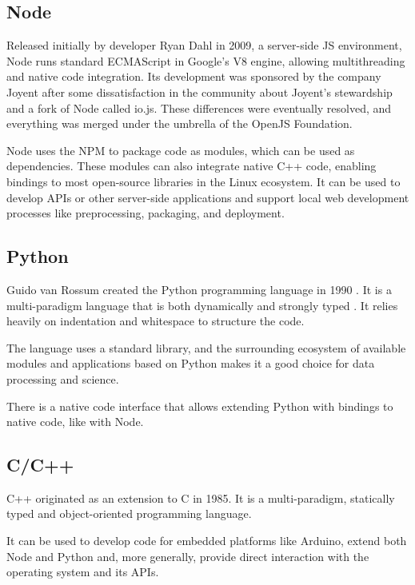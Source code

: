 \subsection{Node}

Released initially by developer Ryan Dahl in 2009, a server-side \ac{JS} environment, Node runs standard ECMAScript in Google's V8 engine, allowing multithreading and native code integration. Its development was sponsored by the company Joyent after some dissatisfaction in the community about Joyent's stewardship and a fork of Node called io.js. These differences were eventually resolved, and everything was merged under the umbrella of the OpenJS Foundation.

Node uses the \ac{NPM} to package code as modules, which can be used as dependencies. These modules can also integrate native C++ code, enabling bindings to most open-source libraries in the Linux ecosystem. It can be used to develop \ac{API}s or other server-side applications and support local web development processes like preprocessing, packaging, and deployment.

\subsection{Python}

Guido van Rossum created the Python programming language in 1990 \parencite{pythonHistory}. It is a multi-paradigm language that is both dynamically and strongly typed \parencite{pythonTyping}. It relies heavily on indentation and whitespace to structure the code.

The language uses a standard library, and the surrounding ecosystem of available modules and applications based on Python makes it a good choice for data processing and science.

There is a native code interface that allows extending Python with bindings to native code, like with Node.

\subsection{C/C++}

C++ originated as an extension to C in 1985. It is a multi-paradigm, statically typed and object-oriented programming language.

It can be used to develop code for embedded platforms like Arduino, extend both Node and Python and, more generally, provide direct interaction with the operating system and its APIs.



